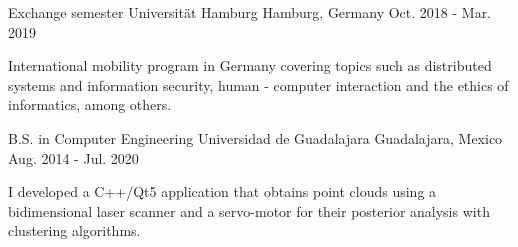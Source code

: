 \begin{cventries}
    \cventry
        {Exchange semester}
        {Universität Hamburg}
        {Hamburg, Germany}
        {Oct. 2018 - Mar. 2019}
        {
            \begin{cvitems}
                \item {International mobility program in Germany covering topics such as distributed systems and information security, human - computer interaction and the ethics of informatics, among others.}
            \end{cvitems}
        }
    \cventry
        {B.S. in Computer Engineering}
        {Universidad de Guadalajara}
        {Guadalajara, Mexico}
        {Aug. 2014 - Jul. 2020}
        {
            \begin{cvitems}
                \item {I developed a C++/Qt5 application that obtains point clouds using a bidimensional laser scanner and a servo-motor for their posterior analysis with clustering algorithms.}
            \end{cvitems}
        }
\end{cventries}
